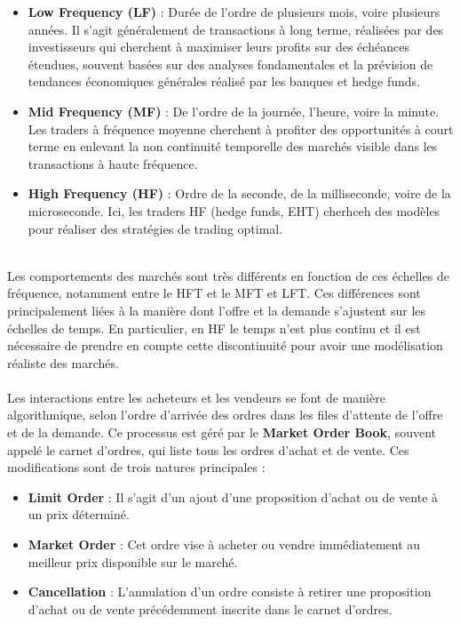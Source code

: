 \documentclass[12pt,a4paper]{article}
\theoremstyle{definition}
\theoremstyle{remark}
\begin{document}
    \begin{itemize}
        \item \textbf{Low Frequency (LF)} : Durée de l'ordre de plusieurs mois, voire plusieurs années. Il s'agit généralement de transactions à long terme, réalisées par des investisseurs qui cherchent à maximiser leurs profits sur des échéances étendues, souvent basées sur des analyses fondamentales et la prévision de tendances économiques générales réalisé par les banques et hedge funds.

        \item \textbf{Mid Frequency (MF)} : De l'ordre de la journée, l'heure, voire la minute. Les traders à fréquence moyenne cherchent à profiter des opportunités à court terme en enlevant la non continuité temporelle des marchés visible dans les transactions à haute fréquence. 

        \item \textbf{High Frequency (HF)} : Ordre de la seconde, de la milliseconde, voire de la microseconde. Ici, les traders HF (hedge funds, EHT) cherhceh des modèles pour réaliser des stratégies de trading optimal.
    \end{itemize}
    \\
    Les comportements des marchés sont très différents en fonction de ces échelles de fréquence, notamment entre le HFT et le MFT et LFT. Ces différences sont principalement liées à la manière dont l'offre et la demande s'ajustent sur les échelles de temps. En particulier, en HF le temps n'est plus continu et il est nécessaire de prendre en compte cette discontinuité pour avoir une modélisation réaliste des marchés.
    \\
    \\
    Les interactions entre les acheteurs et les vendeurs se font de manière algorithmique, selon l'ordre d'arrivée des ordres dans les files d'attente de l'offre et de la demande. Ce processus est géré par le \textbf{Market Order Book}, souvent appelé le carnet d'ordres, qui liste tous les ordres d'achat et de vente. Ces modifications sont de trois natures principales :

    \begin{itemize}
        \item \textbf{Limit Order} : Il s'agit d'un ajout d'une proposition d'achat ou de vente à un prix déterminé. 

        \item \textbf{Market Order} : Cet ordre vise à acheter ou vendre immédiatement au meilleur prix disponible sur le marché. 

        \item \textbf{Cancellation} : L'annulation d'un ordre consiste à retirer une proposition d'achat ou de vente précédemment inscrite dans le carnet d'ordres.
    \end{itemize}
\end{document}
